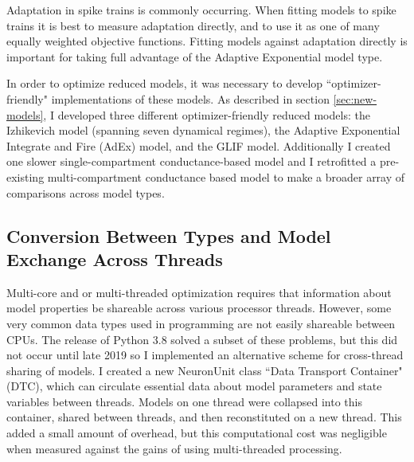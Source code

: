 Adaptation in spike trains is commonly occurring. When fitting models to spike trains it is best to measure adaptation directly, and to use it as one of many equally weighted objective functions. Fitting models against adaptation directly is important for taking full advantage of the Adaptive Exponential model type.


  

In order to optimize reduced models, it was necessary to develop ``optimizer-friendly" implementations of these models.
As described in section \ref{sec:new-models}, I developed three different optimizer-friendly reduced models: the Izhikevich model (spanning seven dynamical regimes), the Adaptive Exponential Integrate and Fire (AdEx) model, and the GLIF model.
Additionally I created one slower single-compartment conductance-based model and I retrofitted a pre-existing multi-compartment conductance based model to make a broader array of comparisons across model types.

\subsection{Conversion Between Types and Model Exchange Across Threads}
Multi-core and or multi-threaded optimization requires that information about model properties be shareable across various processor threads.
However, some very common data types used in programming are not easily shareable between CPUs.
The release of Python 3.8 solved a subset of these problems, but this did not occur until late 2019 so I implemented an alternative scheme for cross-thread sharing of models.
I created a new NeuronUnit class ``Data Transport Container" (DTC), which can circulate essential data about model parameters and state variables between threads.
Models on one thread were collapsed into this container, shared between threads, and then reconstituted on a new thread.
This added a small amount of overhead, but this computational cost was negligible when measured against the gains of using multi-threaded processing.

